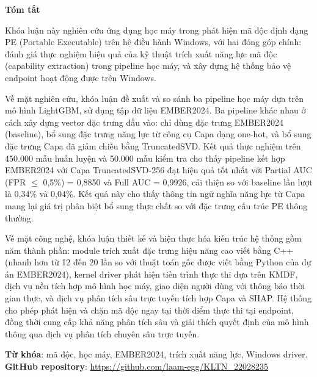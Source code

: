 \begin{center}
\textbf{\large{Tóm tắt}	}
\end{center}


\begin{small}



Khóa luận này nghiên cứu ứng dụng học máy trong phát hiện mã độc
định dạng PE (Portable Executable) trên hệ điều hành Windows, với
hai đóng góp chính: đánh giá thực nghiệm hiệu quả của kỹ thuật
trích xuất năng lực mã độc (capability extraction) trong pipeline
học máy, và xây dựng hệ thống bảo vệ endpoint hoạt động được trên
Windows.

Về mặt nghiên cứu, khóa luận đề xuất và so sánh ba pipeline học
máy dựa trên mô hình LightGBM, sử dụng tập dữ liệu EMBER2024. Ba
pipeline khác nhau ở cách xây dựng vector đặc trưng đầu vào: chỉ
dùng đặc trưng EMBER2024 (baseline), bổ sung đặc trưng năng lực
từ công cụ Capa dạng one-hot, và bổ sung đặc trưng Capa đã giảm
chiều bằng TruncatedSVD. Kết quả thực nghiệm trên 450.000 mẫu huấn
luyện và 50.000 mẫu kiểm tra cho thấy pipeline kết hợp EMBER2024
với Capa TruncatedSVD-256 đạt hiệu quả tốt nhất với Partial AUC
(FPR $\leq$ 0,5\%) = 0,8850 và Full AUC = 0,9926, cải thiện so với
baseline lần lượt là 0,34\% và 0,04\%. Kết quả này cho thấy thông
tin ngữ nghĩa năng lực từ Capa mang lại giá trị phân biệt bổ sung
thực chất so với đặc trưng cấu trúc PE thông thường.

Về mặt công nghệ, khóa luận thiết kế và hiện thực hóa kiến trúc
hệ thống gồm năm thành phần: module trích xuất đặc trưng hiệu năng
cao viết bằng C++ (nhanh hơn từ 12 đến 20 lần so với thuật toán gốc
được viết bằng Python của dự án EMBER2024),
kernel driver phát hiện tiến trình thực thi dựa trên KMDF, dịch vụ
nền tích hợp mô hình học máy, giao diện người dùng với thông báo
thời gian thực, và dịch vụ phân tích sâu trực tuyến tích hợp Capa
và SHAP. Hệ thống cho phép phát hiện và chặn mã độc ngay tại thời
điểm thực thi tại endpoint, đồng thời cung cấp khả năng phân tích
sâu và giải thích quyết định của mô hình thông qua dịch vụ phân
tích chuyên sâu trực tuyến.

\vspace*{1cm}
\textbf{Từ khóa}: mã độc, học máy, EMBER2024,
trích xuất năng lực, Windows driver.
\\
\textbf{GitHub repository}: \url{https://github.com/laam-egg/KLTN_22028235}

\end{small}